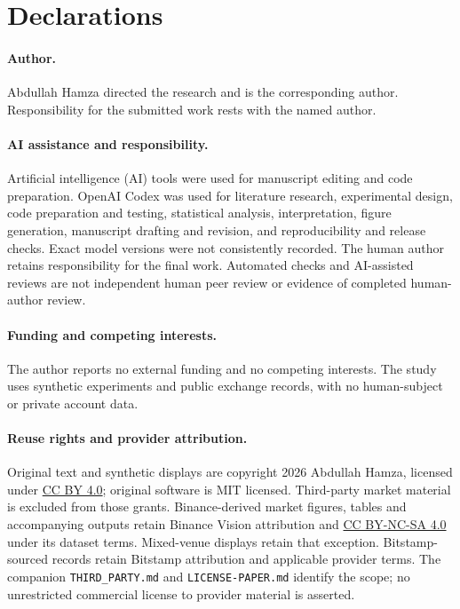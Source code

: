 \section*{Declarations}

\paragraph{Author.}
Abdullah Hamza directed the research and is the corresponding author.
Responsibility for the submitted work rests with the named author.

\paragraph{AI assistance and responsibility.}
Artificial intelligence (AI) tools were used for manuscript editing and code preparation.
OpenAI Codex was used for literature research, experimental design, code
preparation and testing, statistical analysis, interpretation, figure generation,
manuscript drafting and revision, and reproducibility and release checks.
Exact model versions were not consistently recorded. The human author retains
responsibility for the final work. Automated checks and AI-assisted reviews are
not independent human peer review or evidence of completed human-author review.

\paragraph{Funding and competing interests.}
The author reports no external funding and no competing interests.
The study uses synthetic experiments and public exchange records, with no
human-subject or private account data.

\paragraph{Reuse rights and provider attribution.}
Original text and synthetic displays are copyright 2026 Abdullah Hamza,
licensed under \href{https://creativecommons.org/licenses/by/4.0/}{CC BY 4.0};
original software is MIT licensed. Third-party market material is excluded
from those grants. Binance-derived market figures, tables and accompanying
outputs retain Binance Vision attribution and
\href{https://creativecommons.org/licenses/by-nc-sa/4.0/}{CC BY-NC-SA 4.0}
under its dataset terms. Mixed-venue displays retain that exception.
Bitstamp-sourced records retain Bitstamp attribution and applicable provider
terms. The companion \texttt{THIRD\_PARTY.md} and
\texttt{LICENSE-PAPER.md} identify the scope; no unrestricted commercial
license to provider material is asserted.

